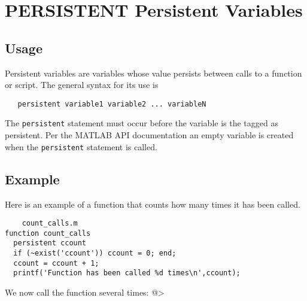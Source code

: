 \section{PERSISTENT Persistent Variables}

\subsection{Usage}

Persistent variables are variables whose value persists between
calls to a function or script.  The general syntax for its
use is
\begin{verbatim}
   persistent variable1 variable2 ... variableN
\end{verbatim}
The \verb|persistent| statement must occur before the variable
is the tagged as persistent.  Per the MATLAB API documentation
an empty variable is created when the \verb|persistent| statement
is called.
\subsection{Example}

Here is an example of a function that counts how many
times it has been called.
\begin{verbatim}
    count_calls.m
function count_calls
  persistent ccount
  if (~exist('ccount')) ccount = 0; end;
  ccount = ccount + 1;
  printf('Function has been called %d times\n',ccount);
\end{verbatim}
We now call the function several times:
@>
